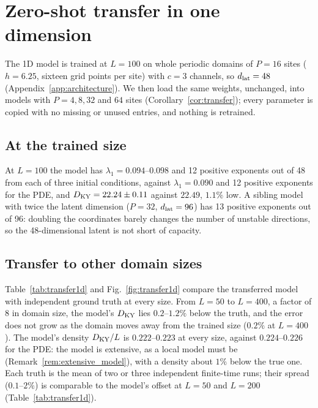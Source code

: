 \section{Zero-shot transfer in one dimension}
\label{sec:results1d}

The 1D model is trained at $L=100$ on whole periodic domains of $P=16$
sites ($h=6.25$, sixteen grid points per site) with $c=3$ channels, so
$d_{\mathrm{lat}}=48$ (Appendix~\ref{app:architecture}). We then load the same
weights, unchanged, into models with $P=4,8,32$ and $64$ sites
(Corollary~\ref{cor:transfer}); every parameter is copied with no missing
or unused entries, and nothing is retrained.

\subsection{At the trained size}

At $L=100$ the model has $\lambda_1=0.094$--$0.098$ and 12 positive
exponents out of 48 from each of three initial conditions, against
$\lambda_1=0.090$ and 12 positive exponents for the PDE, and
$D_{\mathrm{KY}}=22.24\pm0.11$ against $22.49$, $1.1\%$ low. A sibling model with
twice the latent dimension ($P=32$, $d_{\mathrm{lat}}=96$) has 13 positive exponents
out of 96: doubling the coordinates barely changes the number of unstable
directions, so the 48-dimensional latent is not short of capacity.

\subsection{Transfer to other domain sizes}

Table~\ref{tab:transfer1d} and Fig.~\ref{fig:transfer1d} compare the
transferred model with independent ground truth at every size. From
$L=50$ to $L=400$, a factor of 8 in domain size, the model's $D_{\mathrm{KY}}$ lies
$0.2$--$1.2\%$ below the truth, and the error does not grow as the
domain moves away from the trained size ($0.2\%$ at $L=400$). The model's
density $D_{\mathrm{KY}}/L$ is $0.222$--$0.223$ at every size, against
$0.224$--$0.226$ for the PDE: the model is extensive, as a local model
must be (Remark~\ref{rem:extensive_model}), with a density about $1\%$
below the true one. Each truth is the mean of two or three independent
finite-time runs; their spread ($0.1$--$2\%$) is comparable to the
model's offset at $L=50$ and $L=200$ (Table~\ref{tab:transfer1d}).

